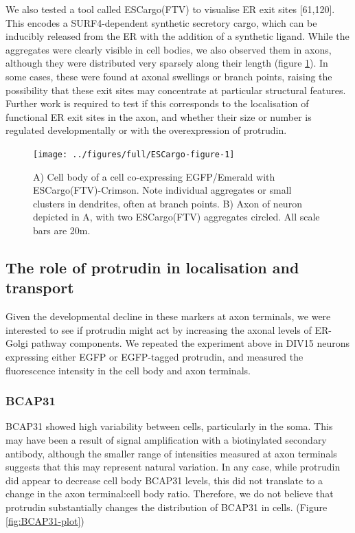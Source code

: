 \documentclass[
  12pt,
  a4paper,
]{book}
\begin{document}
We also tested a tool called ESCargo(FTV) to visualise ER exit sites {[}61,120{]}. This encodes a SURF4-dependent synthetic secretory cargo, which can be inducibly released from the ER with the addition of a synthetic ligand. While the aggregates were clearly visible in cell bodies, we also observed them in axons, although they were distributed very sparsely along their length (figure \ref{fig:ESCargo-figure}). In some cases, these were found at axonal swellings or branch points, raising the possibility that these exit sites may concentrate at particular structural features. Further work is required to test if this corresponds to the localisation of functional ER exit sites in the axon, and whether their size or number is regulated developmentally or with the overexpression of protrudin.

\begin{figure}
\texttt{[image: ../figures/full/ESCargo-figure-1]} \caption[ESCargo localisation in cortical neurons]{A) Cell body of a cell co-expressing EGFP/Emerald with ESCargo(FTV)-Crimson.  Note individual aggregates or small clusters in dendrites, often at branch points.  B) Axon of neuron depicted in A, with two ESCargo(FTV) aggregates circled.  All scale bars are 20\textmu{}m.}\label{fig:ESCargo-figure}
\end{figure}

\hypertarget{the-role-of-protrudin-in-localisation-and-transport}{%
\subsection{The role of protrudin in localisation and transport}\label{the-role-of-protrudin-in-localisation-and-transport}}

Given the developmental decline in these markers at axon terminals, we were interested to see if protrudin might act by increasing the axonal levels of ER-Golgi pathway components. We repeated the experiment above in DIV15 neurons expressing either EGFP or EGFP-tagged protrudin, and measured the fluorescence intensity in the cell body and axon terminals.

\hypertarget{bcap31}{%
\subsubsection{BCAP31}\label{bcap31}}

BCAP31 showed high variability between cells, particularly in the soma. This may have been a result of signal amplification with a biotinylated secondary antibody, although the smaller range of intensities measured at axon terminals suggests that this may represent natural variation. In any case, while protrudin did appear to decrease cell body BCAP31 levels, this did not translate to a change in the axon terminal:cell body ratio. Therefore, we do not believe that protrudin substantially changes the distribution of BCAP31 in cells. (Figure \ref{fig:BCAP31-plot})
\end{document}
